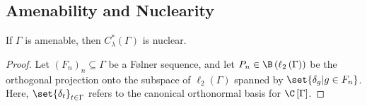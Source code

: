 \subsection{Amenability and Nuclearity}%
\begin{theorem}
  If $\Gamma$ is amenable, then $C^{\ast}_{\lambda}\left( \Gamma \right)$ is nuclear.
\end{theorem}
\begin{proof}
  Let $\left( F_n \right)_n\subseteq \Gamma$ be a Følner sequence, and let $P_n\in \B\left( \ell_2\left( \Gamma \right) \right)$ be the orthogonal projection onto the subspace of $\ell_2\left( \Gamma \right)$ spanned by $\set{\delta_g | g\in F_n}$. Here, $\set{\delta_t}_{t\in\Gamma}$ refers to the canonical orthonormal basis for $\C\left[ \Gamma \right]$.\newline


\end{proof}
